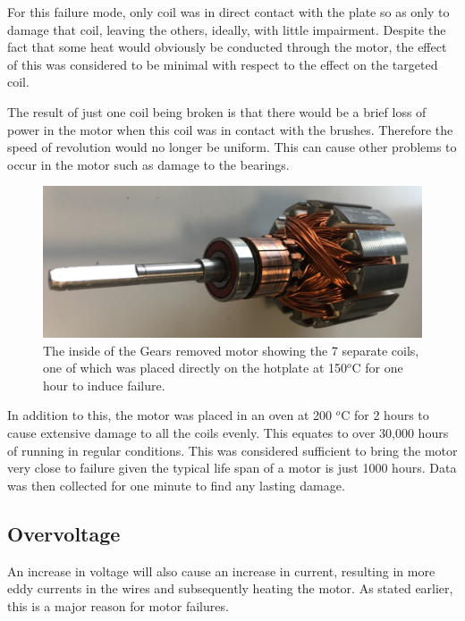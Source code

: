 For this failure mode, only coil was in direct contact with the plate so as only to damage that coil, leaving the others, ideally, with little impairment. Despite the fact that some heat would obviously be conducted through the motor, the effect of this was considered to be minimal with respect to the effect on the targeted coil.

The result of just one coil being broken is that there would be a brief loss of power in the motor when this coil was in contact with the brushes. %
Therefore the speed of revolution would no longer be uniform. This can cause other problems to occur in the motor such as damage to the bearings.

\begin{figure}[t]
    \includegraphics[width=1.0\textwidth]{fig/Gears_Removed_Inside.png}
    \caption[Time Domain]{The inside of the Gears removed motor showing the 7 separate coils, one of which was placed directly on the hotplate at 150$^o$C for one hour to induce failure.}
    \label{fig:hotplate_motor}
\end{figure}

In addition to this, the motor was placed in an oven at 200 $^o$C for 2 hours to cause extensive damage to all the coils evenly. This equates to over 30,000 hours of running in regular conditions. This was considered sufficient to bring the motor very close to failure given the typical life span of a motor is just 1000 hours. %
Data was then collected for one minute to find any lasting damage.



\subsection{Overvoltage}

An increase in voltage will also cause an increase in current, resulting in more eddy currents in the wires and subsequently heating the motor. As stated earlier, this is a major reason for motor failures. 

